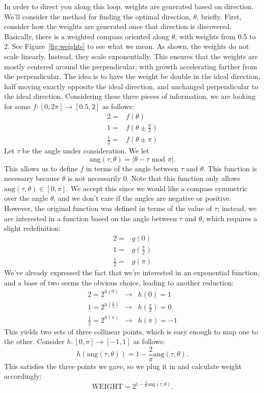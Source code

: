 \documentclass[twocolumn,11pt]{article}
\begin{document}
In order to direct you along this loop, weights are generated based on
direction. We'll consider the method for finding the optimal direction,
$\theta$, briefly. First, consider how the weights are generated once
that direction is discovered. Basically, there is a weighted compass oriented
along $\theta$, with weights from 0.5 to 2. See Figure~\ref{fig:weights} to
see what we mean. As shown, the weights do not scale linearly. Instead, they
scale exponentially. This ensures that the weights are mostly centered around
the perpendicular, with growth accelerating farther from the perpendicular.
The idea is to have the weight be double in the ideal
direction, half moving exactly opposite the ideal direction, and unchanged
perpendicular to the ideal direction. Considering these three pieces of
information, we are looking for some $f : [0,2\pi] \to [0.5,2]$ as follows:
\begin{align*}
  2 = & f(\theta) \\
  1 = & f(\theta \pm \frac{\pi}{2}) \\
  \frac{1}{2} = & f(\theta \pm \pi)
\end{align*}
Let $\tau$ be the angle under consideration. We let
\[ \mbox{ang}(\tau, \theta) = |\theta - \tau \mbox{ mod } \pi|. \]
This allows us to define $f$ in terms of the angle between $\tau$ and
$\theta$. This function is necessary because $\theta$ is not necessarily
0. Note that this function only allows $\mbox{ang}(\tau, \theta)
\in [0,\pi]$. We accept this since we would like a compass symmetric
over the angle $\theta$, and we don't care if the angles are negative
or positive. However, the original function was defined in terms of the
value of $\tau$; instead, we are interested in a function based on the
angle between $\tau$ and $\theta$, which requires a slight redefinition:
\begin{align*}
  2 = & g(0) \\
  1 = & g(\frac{\pi}{2}) \\
  \frac{1}{2} = & g(\pi)
\end{align*}
We've already expressed the fact that we're interested in an exponential
function, and a base of two seems the obvious choice, leading to another
reduction:
\begin{align*}
  2 = 2^{h(0)} & \to & h(0) = 1 \\
  1 = 2^{h(\frac{\pi}{2})} & \to & h(\frac{\pi}{2}) = 0\\
  \frac{1}{2} = 2^{h(\pi)} & \to & h(\pi) = -1
\end{align*}
This yields two sets of three collinear points, which is easy enough to
map one to the other. Consider $h : [0,\pi] \to [-1,1]$ as follows:
\[ h(\mbox{ang}(\tau,\theta)) = 1 - \frac{2}{\pi}\mbox{ang}(\tau, \theta). \]
This satisfies the three points we gave, so we plug it in and calculate weight
accordingly:
\begin{equation}
  \mbox{WEIGHT} = 2^{1-\frac{2}{\pi}\mbox{ang}(\tau,\theta)}. \label{eq:weight}
\end{equation}
\end{document}
